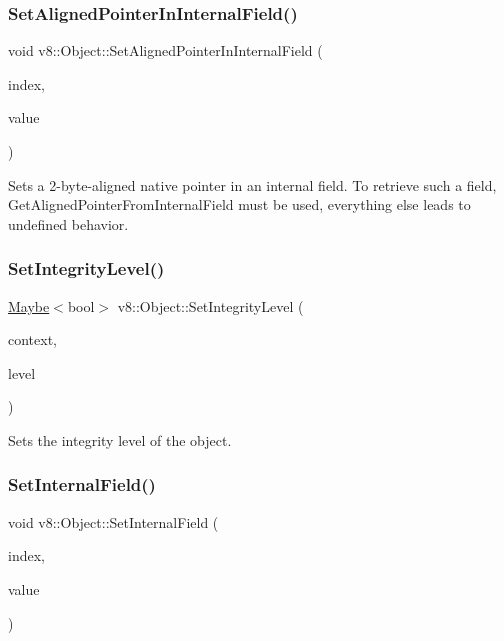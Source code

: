 \subsubsection{\texorpdfstring{Set\+Aligned\+Pointer\+In\+Internal\+Field()}{SetAlignedPointerInInternalField()}}
{\footnotesize\ttfamily void v8\+::\+Object\+::\+Set\+Aligned\+Pointer\+In\+Internal\+Field (\begin{DoxyParamCaption}\item[{int}]{index,  }\item[{void $\ast$}]{value }\end{DoxyParamCaption})}

Sets a 2-\/byte-\/aligned native pointer in an internal field. To retrieve such a field, Get\+Aligned\+Pointer\+From\+Internal\+Field must be used, everything else leads to undefined behavior. \mbox{\label{classv8_1_1Object_ac45163422a18bb7481cc78fcacecb301}} 
\subsubsection{\texorpdfstring{Set\+Integrity\+Level()}{SetIntegrityLevel()}}
{\footnotesize\ttfamily \mbox{\hyperlink{classv8_1_1Maybe}{Maybe}}$<$bool$>$ v8\+::\+Object\+::\+Set\+Integrity\+Level (\begin{DoxyParamCaption}\item[{\mbox{\hyperlink{classv8_1_1Local}{Local}}$<$ Context $>$}]{context,  }\item[{\mbox{\hyperlink{namespacev8_a02642d03ff1eecc2fd358626499c2e30}{Integrity\+Level}}}]{level }\end{DoxyParamCaption})}

Sets the integrity level of the object. \mbox{\label{classv8_1_1Object_aebf949a0592cebc144bb2f96bfb7ec72}} 
\subsubsection{\texorpdfstring{Set\+Internal\+Field()}{SetInternalField()}}
{\footnotesize\ttfamily void v8\+::\+Object\+::\+Set\+Internal\+Field (\begin{DoxyParamCaption}\item[{int}]{index,  }\item[{\mbox{\hyperlink{classv8_1_1Local}{Local}}$<$ \mbox{\hyperlink{classv8_1_1Value}{Value}} $>$}]{value }\end{DoxyParamCaption})}

